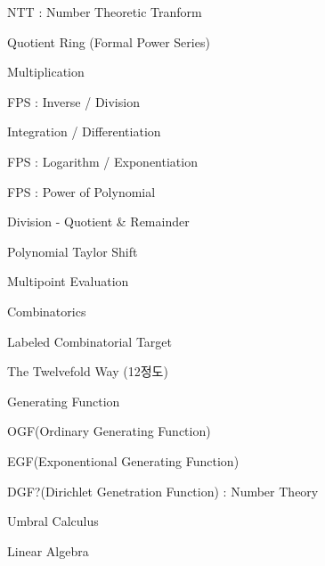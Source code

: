 \documentclass[landscape, 8pt, a4paper, oneside]{extarticle}
\begin{document}
\begin{multicols}{3}
\begin{tcolorbox}[breakable, enhanced, sharp corners, colback=white, colframe=black, boxrule=1pt, left=0pt]
\begin{IdeaNote}
\begin{IdeaNote}
\begin{IdeaNote}
\begin{IdeaNote}
            \end{IdeaNote}
        \item NTT : Number Theoretic Tranform
        \item Quotient Ring (Formal Power Series)
            \begin{IdeaNote}
            \item Multiplication
            \item FPS : Inverse / Division
            \item Integration / Differentiation
            \item FPS : Logarithm / Exponentiation
            \item FPS : Power of Polynomial
            \item Division - Quotient \& Remainder
            \item Polynomial Taylor Shift
            \item Multipoint Evaluation
            \end{IdeaNote}
        \end{IdeaNote}
    \item Combinatorics
        \begin{IdeaNote}
        \item Labeled Combinatorial Target
        \item The Twelvefold Way (12정도)
        \item Generating Function
            \begin{IdeaNote}
            \item OGF(Ordinary Generating Function)
            \item EGF(Exponentional Generating Function)
            \item DGF?(Dirichlet Genetration Function) : Number Theory
            \end{IdeaNote}
        \item Umbral Calculus
        \end{IdeaNote}
    \end{IdeaNote}

\item Linear Algebra


\end{IdeaNote}
\end{tcolorbox}
\end{multicols}
\end{document}
